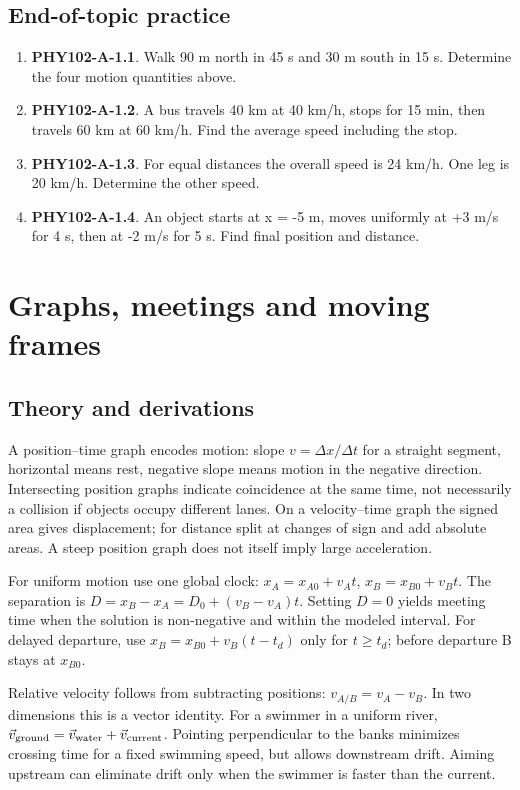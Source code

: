 \documentclass[11pt,a4paper,openany]{book}
\begin{document}
\section{End-of-topic practice}
\begin{enumerate}
\item \textbf{PHY102-A-1.1}. Walk 90 m north in 45 s and 30 m south in 15 s. Determine the four motion quantities above.
\item \textbf{PHY102-A-1.2}. A bus travels 40 km at 40 km/h, stops for 15 min, then travels 60 km at 60 km/h. Find the average speed including the stop.
\item \textbf{PHY102-A-1.3}. For equal distances the overall speed is 24 km/h. One leg is 20 km/h. Determine the other speed.
\item \textbf{PHY102-A-1.4}. An object starts at x = -5 m, moves uniformly at +3 m/s for 4 s, then at -2 m/s for 5 s. Find final position and distance.
\end{enumerate}
\chapter{Graphs, meetings and moving frames}
\section{Theory and derivations}
A position--time graph encodes motion: slope $v=\Delta x/\Delta t$ for a straight segment, horizontal means rest, negative slope means motion in the negative direction. Intersecting position graphs indicate coincidence at the same time, not necessarily a collision if objects occupy different lanes. On a velocity--time graph the signed area gives displacement; for distance split at changes of sign and add absolute areas. A steep position graph does not itself imply large acceleration.

For uniform motion use one global clock: $x_A=x_{A0}+v_A t$, $x_B=x_{B0}+v_B t$. The separation is $D=x_B-x_A=D_0+(v_B-v_A)t$. Setting $D=0$ yields meeting time when the solution is non-negative and within the modeled interval. For delayed departure, use $x_B=x_{B0}+v_B(t-t_d)$ only for $t\ge t_d$; before departure B stays at $x_{B0}$.

Relative velocity follows from subtracting positions: $v_{A/B}=v_A-v_B$. In two dimensions this is a vector identity. For a swimmer in a uniform river, $\vec v_{\rm ground}=\vec v_{\rm water}+\vec v_{\rm current}$. Pointing perpendicular to the banks minimizes crossing time for a fixed swimming speed, but allows downstream drift. Aiming upstream can eliminate drift only when the swimmer is faster than the current.
\begin{center}
\end{center}
\end{document}
